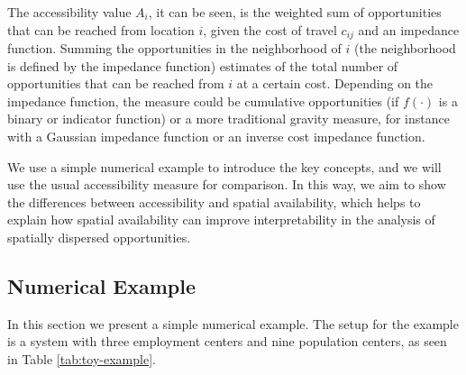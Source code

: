 \documentclass[]{elsarticle} %
\begin{document}
The accessibility value \(A_i\), it can be seen, is the weighted sum of
opportunities that can be reached from location \(i\), given the cost of
travel \(c_{ij}\) and an impedance function. Summing the opportunities
in the neighborhood of \(i\) (the neighborhood is defined by the
impedance function) estimates of the total number of opportunities that
can be reached from \(i\) at a certain cost. Depending on the impedance
function, the measure could be cumulative opportunities (if \(f(\cdot)\)
is a binary or indicator function) or a more traditional gravity
measure, for instance with a Gaussian impedance function or an inverse
cost impedance function.

We use a simple numerical example to introduce the key concepts, and we
will use the usual accessibility measure for comparison. In this way, we
aim to show the differences between accessibility and spatial
availability, which helps to explain how spatial availability can
improve interpretability in the analysis of spatially dispersed
opportunities.

\hypertarget{numerical-example}{%
\subsection{Numerical Example}\label{numerical-example}}

In this section we present a simple numerical example. The setup for the
example is a system with three employment centers and nine population
centers, as seen in Table \ref{tab:toy-example}.
\end{document}
